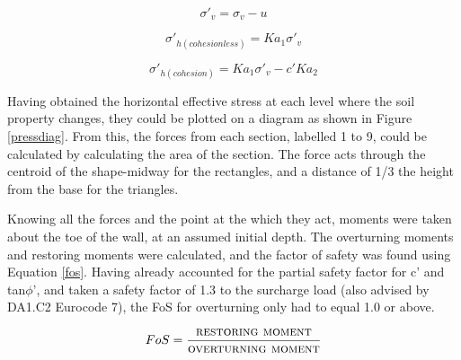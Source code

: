\documentclass[12pt, a4paper]{article}
\begin{document}
\begin{equation}
    \sigma'_v=\sigma_v-u
    \label{sigvdash}
\end{equation}

\begin{equation}
    \sigma'_{h(cohesionless)}=Ka_1 \sigma'_v
    \label{horizstresscohesionless}
\end{equation}
    
\begin{equation}
      \sigma'_{h(cohesion)}=Ka_1\sigma'_v-c'Ka_2
      \label{horizstresscohesion}
\end{equation}
\begin{justify}
Having obtained the horizontal effective stress at each level where the soil property changes, they could be plotted on a diagram as shown in Figure \ref{pressdiag}. From this, the forces from each section, labelled 1 to 9, could be calculated by calculating the area of the section. The force acts through the centroid of the shape-midway for the rectangles, and a distance of 1/3 the height from the base for the triangles.
\end{justify}

\begin{justify}
Knowing all the forces and the point at the which they act, moments were taken about the toe of the wall, at an assumed initial depth. The overturning moments and restoring moments were calculated, and the factor of safety was found using Equation \ref{fos}.  Having already accounted for the partial safety factor for c' and tan$\phi$', and taken a safety factor of 1.3 to the surcharge load (also advised by DA1.C2 Eurocode 7), the FoS for overturning only had to equal 1.0 or above.
\end{justify}
\begin{equation}
    FoS=\frac{\textsc{restoring moment}}{\textsc{overturning moment}}
\label{fos}
\end{equation}
\end{document}
